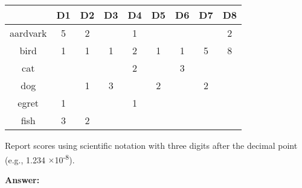 \documentclass[11pt]{article}
\newcommand{\super}{\textsuperscript}
\newcommand{\mult}{$\times$}
\begin{document}
\begin{enumerate}
        \begin{table}[ht]
            \centering
            \begin{tabular}[t]{|c|c|c|c|c|c|c|c|c|}
                \hline
                & \textbf{D1} & \textbf{D2} & D3 & D4 & D5 & D6 & D7 & D8
                \\ \hline
                aardvark    & 5 & 2 &   & 1 &   &   &   & 2
                \\ \hline
                bird        & 1 & 1 & 1 & 2 & 1 & 1 & 5 & 8
                \\ \hline
                cat         &   &   &   & 2 &   & 3 &   &
                \\ \hline
                dog         &   & 1 & 3 &   & 2 &   & 2 &
                \\ \hline
                egret       & 1 &   &   & 1 &   &   &   &
                \\ \hline
                fish        & 3 & 2 &   &   &   &   &   &
                \\ \hline
            \end{tabular}
        \end{table}

        Report scores using scientific notation with three digits after the decimal point (e.g., 1.234 \mult 10\super{-8}).

        \textbf{Answer:}

    \end{enumerate}
\end{document}
